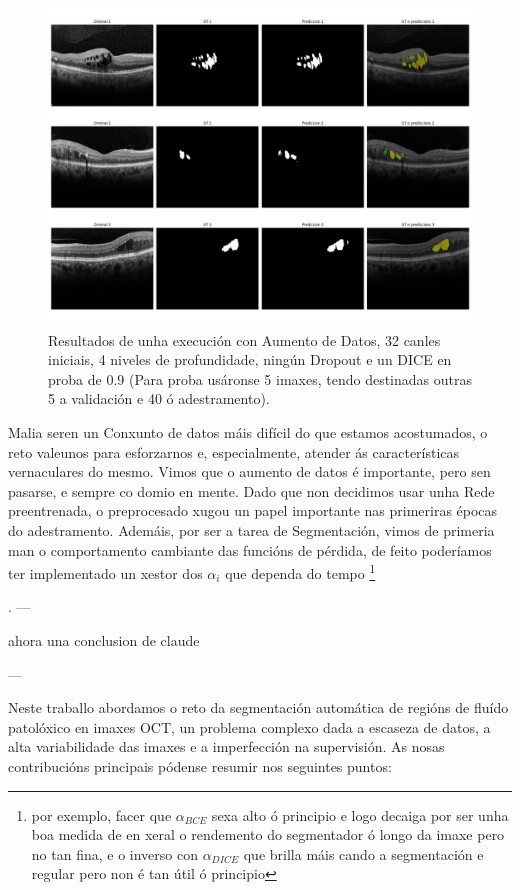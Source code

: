 \documentclass{article}
\begin{document}
\begin{figure}[H]
	\centering
	\includegraphics[width=\linewidth]{figuras/conclusion.jpg}
	\caption{Resultados de unha execución con Aumento de Datos, 32 canles iniciais, 4 niveles de profundidade, ningún Dropout e un DICE en proba de 0.9 (Para proba usáronse 5 imaxes, tendo destinadas outras 5 a validación e 40 ó adestramento). }
\end{figure}

Malia seren un Conxunto de datos máis difícil do que estamos acostumados, o reto valeunos para esforzarnos e, especialmente, atender ás características vernaculares do mesmo. Vimos que o aumento de datos é importante, pero sen pasarse, e sempre co domio en mente. Dado que non decidimos usar unha Rede preentrenada, o preprocesado xugou un papel importante nas primeriras épocas do adestramento. Ademáis, por ser a tarea de Segmentación, vimos de primeria man o comportamento cambiante das funcións de pérdida, de feito poderíamos ter implementado un xestor dos $\alpha_i$ que dependa do tempo \footnote{por exemplo, facer que $\alpha_{BCE}$ sexa alto ó principio e logo decaiga por ser unha boa medida de en xeral o rendemento do segmentador ó longo da imaxe pero no tan fina, e o inverso con $\alpha_{DICE}$ que brilla máis cando a segmentación e regular pero non é tan útil ó principio}

.
---

ahora una conclusion de claude 

---

Neste traballo abordamos o reto da segmentación automática de regións de fluído patolóxico en imaxes OCT, un problema complexo dada a escaseza de datos, a alta variabilidade das imaxes e a imperfección na supervisión. As nosas contribucións principais pódense resumir nos seguintes puntos:
\end{document}
